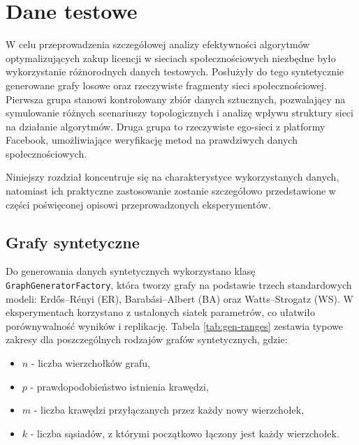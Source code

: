 \chapter{Dane testowe}\label{chap:testdata}
W celu przeprowadzenia szczegółowej analizy efektywności algorytmów optymalizujących zakup licencji w sieciach społecznościowych niezbędne było wykorzystanie różnorodnych danych testowych. Posłużyły do tego syntetycznie generowane grafy losowe oraz rzeczywiste fragmenty sieci społecznościowej. Pierwsza grupa stanowi kontrolowany zbiór danych sztucznych, pozwalający na symulowanie różnych scenariuszy topologicznych i analizę wpływu struktury sieci na działanie algorytmów. Druga grupa to rzeczywiste ego-sieci z platformy Facebook, umożliwiające weryfikację metod na prawdziwych danych społecznościowych.

Niniejszy rozdział koncentruje się na charakterystyce wykorzystanych danych, natomiast ich praktyczne zastosowanie zostanie szczegółowo przedstawione w części poświęconej opisowi przeprowadzonych eksperymentów.

\section{Grafy syntetyczne}

Do generowania danych syntetycznych wykorzystano klasę \texttt{GraphGeneratorFactory}, która tworzy grafy na podstawie trzech standardowych modeli: Erd\H{o}s--Rényi (ER), Barabási--Albert (BA) oraz Watts--Strogatz (WS). W eksperymentach korzystano z ustalonych siatek parametrów, co ułatwiło porównywalność wyników i replikację. Tabela \ref{tab:gen-ranges} zestawia typowe zakresy dla poszczególnych rodzajów grafów syntetycznych,
gdzie:
\begin{itemize}
  \item $n$ - liczba wierzchołków grafu,
  \item $p$ - prawdopodobieństwo istnienia krawędzi,
  \item $m$ - liczba krawędzi przyłączanych przez każdy nowy wierzchołek,
  \item $k$ - liczba sąsiadów, z którymi początkowo łączony jest każdy wierzchołek.
\end{itemize}

